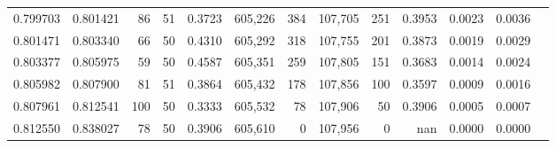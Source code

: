 \begin{tabular}{rrrrrrrrrrrrr}
0.799703 & 0.801421 &    86 &  51 &                                     0.3723 & 605,226 &     384 & 107,705 &     251 & 0.3953 & 0.0023 & 0.0036 \\
0.801471 & 0.803340 &    66 &  50 &                                     0.4310 & 605,292 &     318 & 107,755 &     201 & 0.3873 & 0.0019 & 0.0029 \\
0.803377 & 0.805975 &    59 &  50 &                                     0.4587 & 605,351 &     259 & 107,805 &     151 & 0.3683 & 0.0014 & 0.0024 \\
0.805982 & 0.807900 &    81 &  51 &                                     0.3864 & 605,432 &     178 & 107,856 &     100 & 0.3597 & 0.0009 & 0.0016 \\
0.807961 & 0.812541 &   100 &  50 &                                     0.3333 & 605,532 &      78 & 107,906 &      50 & 0.3906 & 0.0005 & 0.0007 \\
0.812550 & 0.838027 &    78 &  50 &                                     0.3906 & 605,610 &       0 & 107,956 &       0 &    nan & 0.0000 & 0.0000 \\
\bottomrule
\end{tabular}
